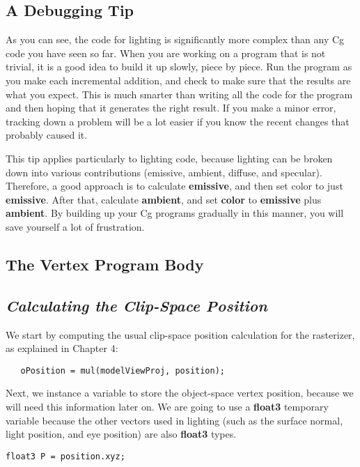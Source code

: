 \documentclass[../main.tex]{subfiles}
\begin{document}
\subsection*{A Debugging Tip}

As you can see, the code for lighting is significantly more complex than any Cg code you have seen so far. When you are working on a program that is not trivial, it is a good idea to build it up slowly, piece by piece. Run the program as you make each incremental addition, and check to make sure that the results are what you expect. This is much smarter than writing all the code for the program and then hoping that it generates the right result. If you make a minor error, tracking down a problem will be a lot easier if you know the recent changes that probably caused it.

This tip applies particularly to lighting code, because lighting can be broken down into various contributions (emissive, ambient, diffuse, and specular). Therefore, a good approach is to calculate \textbf{emissive}, and then set color to just \textbf{emissive}. After that, calculate \textbf{ambient}, and set \textbf{color} to \textbf{emissive} plus \textbf{ambient}. By building up your Cg programs gradually in this manner, you will save yourself a lot of frustration.

\subsection*{The Vertex Program Body}

\subsection*{\textit{Calculating the Clip-Space Position}}

We start by computing the usual clip-space position calculation for the rasterizer, as explained in Chapter 4:
\FloatBarrier
\begin{lstlisting}
   oPosition = mul(modelViewProj, position);
\end{lstlisting}
\FloatBarrier

Next, we instance a variable to store the object-space vertex position, because we will need this information later on. We are going to use a \textbf{float3} temporary variable because the other vectors used in lighting (such as the surface normal, light position, and eye position) are also \textbf{float3} types.

\FloatBarrier
\begin{lstlisting}
float3 P = position.xyz;
\end{lstlisting}
\FloatBarrier
\end{document}
